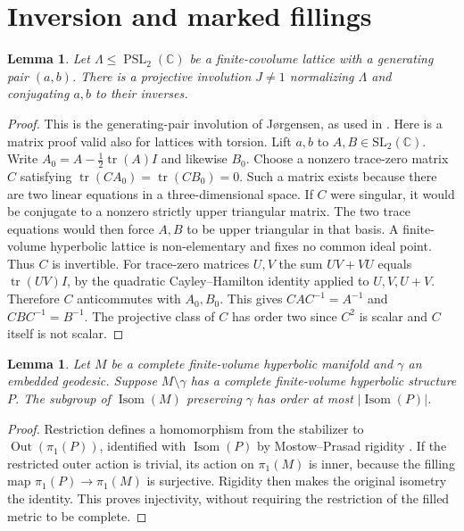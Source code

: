 \documentclass[11pt]{article}
\newtheorem{lemma}[theorem]{Lemma}
\newcommand{\Isom}{\operatorname{Isom}}
\newcommand{\Out}{\operatorname{Out}}
\newcommand{\PSL}{\operatorname{PSL}}
\begin{document}
\section{Inversion and marked fillings}
\begin{lemma}\label{lem:inversion}
Let $\Lambda\le\PSL_2(\mathbb C)$ be a finite-covolume lattice
with a generating pair $(a,b)$. There is a projective involution
$J\ne1$ normalizing $\Lambda$ and conjugating $a,b$ to their inverses.
\end{lemma}
\begin{proof}
This is the generating-pair involution of J\o rgensen, as used in
\cite[Lemma~22]{bw}. Here is a matrix proof valid also for lattices
with torsion. Lift $a,b$ to $A,B\in\mathrm{SL}_2(\mathbb C)$.
Write $A_0=A-\tfrac12\operatorname{tr}(A)I$ and likewise $B_0$.
Choose a nonzero trace-zero matrix $C$ satisfying
$\operatorname{tr}(CA_0)=\operatorname{tr}(CB_0)=0$. Such a matrix
exists because there are two linear equations in a three-dimensional
space. If $C$ were singular, it would be conjugate to a nonzero
strictly upper triangular matrix. The two trace equations would
then force $A,B$ to be upper triangular in that basis. A finite-volume
hyperbolic lattice is non-elementary and fixes no common ideal point.
Thus $C$ is invertible. For trace-zero matrices $U,V$ the sum
$UV+VU$ equals $\operatorname{tr}(UV)I$, by the quadratic
Cayley--Hamilton identity applied to $U,V,U+V$. Therefore $C$
anticommutes with $A_0,B_0$. This gives $CAC^{-1}=A^{-1}$ and
$CBC^{-1}=B^{-1}$. The projective class of $C$ has order two since
$C^2$ is scalar and $C$ itself is not scalar.
\end{proof}

\begin{lemma}\label{lem:drilling}
Let $M$ be a complete finite-volume hyperbolic manifold and $\gamma$
an embedded geodesic. Suppose $M\setminus\gamma$ has a complete
finite-volume hyperbolic structure $P$. The subgroup of
$\Isom(M)$ preserving $\gamma$ has order at most $|\Isom(P)|$.
\end{lemma}
\begin{proof}
Restriction defines a homomorphism from the stabilizer to
$\Out(\pi_1(P))$, identified with $\Isom(P)$ by Mostow--Prasad
rigidity \cite[Theorem~1.10]{afw}. If the restricted outer action
is trivial, its action on $\pi_1(M)$ is inner, because the filling
map $\pi_1(P)\to\pi_1(M)$ is surjective. Rigidity then makes the
original isometry the identity. This proves injectivity, without
requiring the restriction of the filled metric to be complete.
\end{proof}
\end{document}
